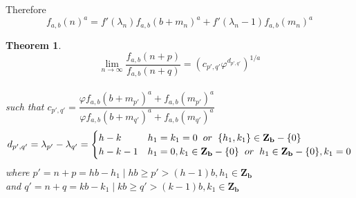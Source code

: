 \documentclass[preprint,12pt]{elsarticle}
\newtheorem{theorem}{Theorem}[section]
\begin{document}
Therefore $$f_{a,b}(n)^a = f'(\lambda_n)f_{a,b}(b+m_n)^a+f'(\lambda_n-1)f_{a,b}(m_n)^a$$
\begin{theorem}
	\label{lim-cons}
	$$\lim_{n \to \infty} \dfrac{f_{a,b}(n + p)}{f_{a,b}(n + q)} = \left(c_{p',q'}\varphi^{d_{p',q'}}\right)^{1/a}$$\\
	such that $c_{p',q'} = \dfrac{\varphi f_{a,b}(b+m_{p'})^a + f_{a,b}(m_{p'})^a}{\varphi f_{a,b}(b+m_{q'})^a + f_{a,b}(m_{q'})^a}$\\
	\begin{equation*}
		d_{p', q'} = \lambda_{p'} - \lambda_{q'} = \begin{cases}
		h - k & h_1 = k_1 = 0 \hspace{2mm}or\hspace{2mm} \{h_1,k_1\} \in \mathbf{Z_b} - \{0\}\\
		h - k - 1 & h_1 = 0, k_1 \in \mathbf{Z_b} - \{0\} \hspace{2mm}or\hspace{2mm} h_1 \in \mathbf{Z_b} - \{0\}, k_1 = 0
		\end{cases}
	\end{equation*}
	where $p' = n + p = hb - h_1 \mid hb \geq p' > (h-1)b, h_1\in\mathbf{Z_b}$\\
	and $q' = n + q = kb - k_1 \mid kb \geq q' > (k-1)b, k_1\in\mathbf{Z_b}$
\end{theorem}
\end{document}
